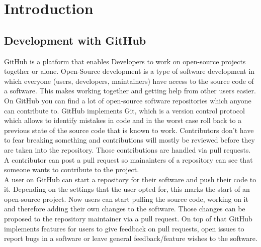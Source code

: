 \documentclass[sigconf]{acmart}
\begin{document}



\maketitle
\pagestyle{plain}



\section{Introduction}

\subsection{Development with GitHub}

GitHub is a platform that enables Developers to work on open-source projects together or alone. \cite{github} Open-Source development is a type of software development in which everyone (users, developers, maintainers) have access to the source code of a software. This makes working together and getting help from other users easier.\\

On GitHub you can find a lot of open-source software repositories which anyone can contribute to. GitHub implements Git, which is a version control protocol which allows to identify mistakes in code and in the worst case roll back to a previous state of the source code that is known to work. Contributors don’t have to fear breaking something and contributions will mostly be reviewed before they are taken into the repository. Those contributions are handled via pull requests. A contributor can post a pull request so mainainters of a repository can see that someone wants to contribute to the project.\\

A user on GitHub can start a repository for their software and push their code to it. Depending on the settings that the user opted for, this marks the start of an open-source project.
Now users can start pulling the source code, working on it and therefore adding their own changes to the software. Those changes can be proposed to the repository maintainer via a pull request.
On top of that GitHub implements features for users to give feedback on pull requests, open issues to report bugs in a software or leave general feedback/feature wishes to the software.\\
\end{document}
